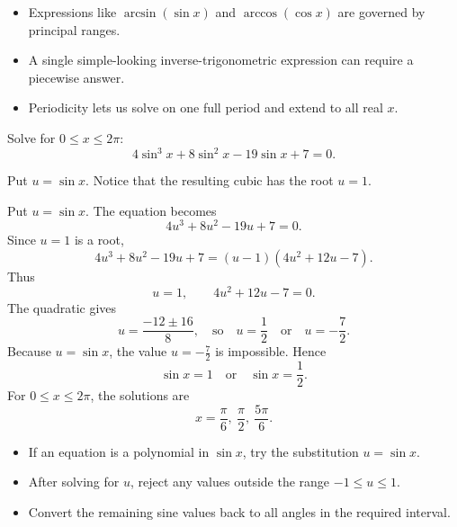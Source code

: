 \begin{takeaways}
\begin{itemize}[leftmargin=*]
  \item Expressions like $\arcsin(\sin x)$ and $\arccos(\cos x)$ are governed by
        principal ranges.
  \item A single simple-looking inverse-trigonometric expression can require a
        piecewise answer.
  \item Periodicity lets us solve on one full period and extend to all real
        $x$.
\end{itemize}
\end{takeaways}

\begin{problem}
Solve for $0\le x\le2\pi$:
\[
4\sin^3x+8\sin^2x-19\sin x+7=0.
\]
\end{problem}

\begin{hintbox}
Put $u=\sin x$. Notice that the resulting cubic has the root $u=1$.
\end{hintbox}

\begin{solution}
Put $u=\sin x$. The equation becomes
\[
4u^3+8u^2-19u+7=0.
\]
Since $u=1$ is a root,
\[
4u^3+8u^2-19u+7=(u-1)(4u^2+12u-7).
\]
Thus
\[
u=1,
\qquad
4u^2+12u-7=0.
\]
The quadratic gives
\[
u=\frac{-12\pm16}{8},
\quad\text{so}\quad
u=\frac12 \quad\text{or}\quad u=-\frac72.
\]
Because $u=\sin x$, the value $u=-\frac72$ is impossible. Hence
\[
\sin x=1
\quad\text{or}\quad
\sin x=\frac12.
\]
For $0\le x\le2\pi$, the solutions are
\[
\boxed{x=\frac{\pi}{6},\ \frac{\pi}{2},\ \frac{5\pi}{6}}.
\]
\end{solution}

\begin{takeaways}
\begin{itemize}[leftmargin=*]
  \item If an equation is a polynomial in $\sin x$, try the substitution
        $u=\sin x$.
  \item After solving for $u$, reject any values outside the range
        $-1\le u\le1$.
  \item Convert the remaining sine values back to all angles in the required
        interval.
\end{itemize}
\end{takeaways}

